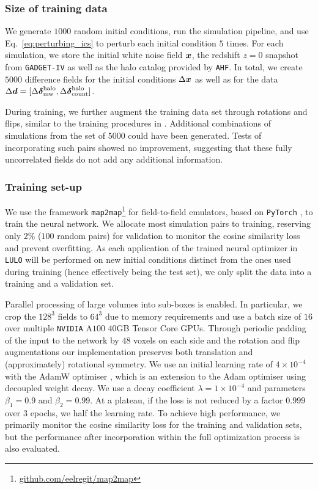 \subsubsection{Size of training data}
We generate $1000$ random initial conditions, run the simulation pipeline, and use Eq.~\eqref{eq:perturbing_ics} to perturb each initial condition $5$ times. For each simulation, we store the initial white noise field $\boldsymbol{x}$, the redshift $z=0$ snapshot from \texttt{GADGET-IV} as well as the halo catalog provided by \texttt{AHF}. In total, we create $5000$ difference fields for the initial conditions $\Delta \boldsymbol{x}$ as well as for the data $\Delta \boldsymbol{d} = [\Delta \boldsymbol{\delta}^{\mathrm{halo}}_{\mathrm{mw}}, \Delta \boldsymbol{\delta}^{\mathrm{halo}}_{\mathrm{count}}]$. 

During training, we further augment the training data set through rotations and flips, similar to the training procedures in \citet{He2019,Jamieson2022b}. Additional combinations of simulations from the set of $5000$ could have been generated. Tests of incorporating such pairs showed no improvement, suggesting that these fully uncorrelated fields do not add any additional information. 

\subsubsection{Training set-up}
We use the framework \texttt{map2map}\footnote{\href{https://github.com/eelregit/map2map}{github.com/eelregit/map2map}} for field-to-field emulators, based on \texttt{PyTorch} \citep{Paszke2019}, to train the neural network. We allocate most simulation pairs to training, reserving only $2\%$ ($100$ random pairs) for validation to monitor the cosine similarity loss and prevent overfitting. As each application of the trained neural optimizer in \texttt{LULO} will be performed on new initial conditions distinct from the ones used during training (hence effectively being the test set), we only split the data into a training and a validation set.  

Parallel processing of large volumes into sub-boxes is enabled. In particular, we crop the $128^3$ fields to $64^3$ due to memory requirements and use a batch size of $16$ over multiple \texttt{NVIDIA} A$100$ $40$GB Tensor Core GPUs. Through periodic padding of the input to the network by $48$ voxels on each side and the rotation and flip augmentations our implementation preserves both translation and (approximately) rotational symmetry. We use an initial learning rate of $4 \times 10^{-4}$ with the AdamW optimiser \citep{Loshchilov2019}, which is an extension to the Adam optimiser \citep{Kingma2014} using decoupled weight decay. We use a decay coefficient $\lambda=1\times 10^{-4}$ and parameters $\beta_1=0.9$ and $\beta_2=0.99$. At a plateau, if the loss is not reduced by a factor $0.999$ over $3$ epochs, we half the learning rate. To achieve high performance, we primarily monitor the cosine similarity loss for the training and validation sets, but the performance after incorporation within the full optimization process is also evaluated.

